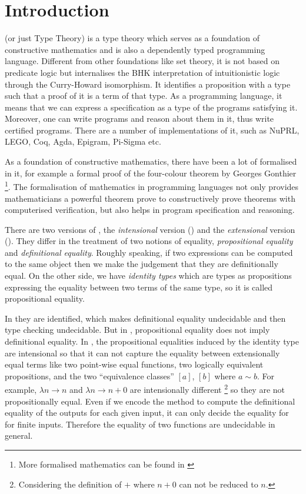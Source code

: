 \chapter{Introduction}

\mltt (or just Type Theory) is a type theory which serves as a foundation of constructive mathematics and is also a dependently typed programming language. Different from other foundations like set theory, it is not based on predicate logic but internalises the BHK interpretation of intuitionistic logic through the Curry-Howard isomorphism. It identifies a proposition with a type such that a proof of it is a term of that type. 
As a programming language, it means that we can express a specification as a type of the programs satisfying it.
Moreover, one can write programs and reason about them in it, thus write certified programs. There are a number of implementations of it, such as NuPRL, LEGO, Coq, Agda, Epigram, Pi-Sigma etc.


As a foundation of constructive mathematics, there have been a lot of \maths formalised in it, for example a formal proof of the four-colour theorem by Georges Gonthier \cite{gonthier08ams} \footnote{More formalised mathematics can be found in \cite{sbfm}}. The formalisation of mathematics in programming languages not only provides mathematicians a powerful theorem prove to constructively prove theorems with computerised verification, but also helps in program specification and reasoning. 

There are two versions of \mltt, the \emph{intensional} version (\itt) and the \emph{extensional} version (\ett).  They differ in the treatment of two notions of equality, \emph{propositional equality} and \emph{definitional equality}.  Roughly speaking, if two expressions can be computed to the same object then we make the judgement that they are definitionally equal. On the other side, we have \emph{identity types} which are types as propositions expressing the equality between two terms of the same type, so it is called propositional equality.

In \ett they are identified, which makes definitional equality undecidable and then type checking undecidable. But in \itt, propositional equality does not imply definitional equality.
In \itt, the propositional equalities induced by the identity type are intensional so that it 
can not capture the equality between extensionally equal terms like two point-wise equal functions, two logically equivalent propositions, and the two ``equivalence classes'' $[a]$, $[b]$ where $a \sim b$. 
For example, $\lambda n \to n$ and $\lambda n \to n + 0$ are intensionally different \footnote{Considering the definition of $+$ where $n+0$ can not be reduced to $n$.} so they are not propositionally equal.
Even if we encode the method to compute
the definitional equality of the outputs for each given input, it can
only decide the equality for for finite inputs.
Therefore the equality of two functions are undecidable in general.

